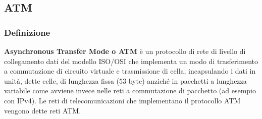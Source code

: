 \documentclass[8pt]{extarticle}
\begin{document}
\subsection{ATM}
\subsubsection{Definizione}
\noindent
\textbf{Asynchronous Transfer Mode o ATM} è un protocollo di rete di livello di collegamento dati del modello 
ISO/OSI che implementa un modo di trasferimento a commutazione di circuito virtuale e trasmissione di 
cella, incapsulando i dati in unità, dette celle, di lunghezza fissa (53 byte) anziché in pacchetti a 
lunghezza variabile come avviene invece nelle reti a commutazione di pacchetto (ad esempio con IPv4). 
Le reti di telecomunicazioni che implementano il protocollo ATM vengono dette reti ATM.
\end{document}
